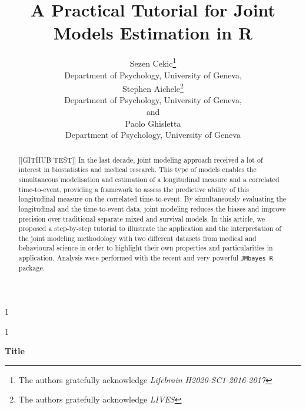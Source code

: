 \documentclass[12pt]{article}
\newcommand{\blind}{1}
\begin{document}
%


\renewcommand{\baselinestretch}{1.2}



\blind
{
  \title{\bf A Practical Tutorial for Joint Models Estimation in R}
  \author{
    Sezen Cekic\thanks{
    The authors gratefully acknowledge \textit{Lifebrain H2020-SC1-2016-2017}}\hspace{.2cm}\\
    Department of Psychology, University of Geneva,   \\
    Stephen Aichele\thanks{
    The authors gratefully acknowledge \textit{LIVES}}\hspace{.2cm}\\
    Department of Psychology, University of Geneva,\\
    and \\
    Paolo Ghisletta \\
    Department of Psychology, University of Geneva}
  \maketitle
} \fi

\blind
{
  \bigskip
  \bigskip
  \bigskip
  \begin{center}
    {\LARGE\bf Title}
\end{center}
  \medskip
} \fi

\bigskip
\begin{abstract}
[[GITHUB TEST]] In the last decade, joint modeling approach received a lot of interest in biostatistics and medical research.
This type of models enables the simultaneous modelisation and estimation of a longitudinal measure and a correlated time-to-event, providing a framework to assess the predictive ability of this longitudinal measure on the correlated time-to-event. By simultaneously evaluating the longitudinal and the time-to-event data, joint modeling reduces the biases and improve precision over traditional separate mixed and survival models. In this article, we proposed a step-by-step tutorial to illustrate the application and the interpretation of the joint modeling methodology with two different datasets from medical and behavioural science in order to highlight their own properties and particularities in application. Analysis were performed with the recent and very powerful \texttt{JMbayes R} package.

\end{abstract}
\end{document}
